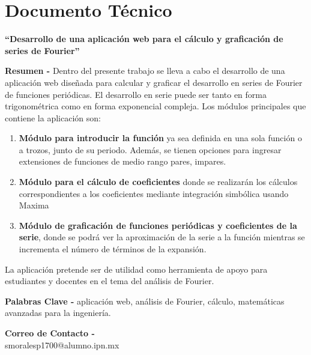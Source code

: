 \chapter{Documento Técnico}
\begin{center}
	\textbf{\Large “Desarrollo de una aplicación web para el cálculo y graficación de series de Fourier”}
	\vspace{0.5cm}
\end{center}

\textbf{Resumen -} Dentro del presente trabajo se lleva a cabo el desarrollo de una aplicación web diseñada para calcular y graficar el desarrollo en series de Fourier de funciones periódicas. El desarrollo en serie puede ser tanto en forma trigonométrica como en forma exponencial compleja. Los módulos principales que contiene la aplicación son:

\begin{enumerate}
	\item \textbf{Módulo para introducir la función} ya sea definida en una sola función o a trozos, junto de su periodo. Además, se tienen opciones para ingresar extensiones de funciones de medio rango pares, impares.
	\item \textbf{Módulo para el cálculo de coeficientes} donde se realizarán los cálculos correspondientes a los coeficientes mediante integración simbólica usando Maxima
	\item \textbf{Módulo de graficación de funciones periódicas y coeficientes de la serie}, donde se podrá ver la aproximación de la serie a la función mientras se incrementa el número de términos de la expansión.
\end{enumerate}

 La aplicación pretende ser de utilidad como herramienta de apoyo para estudiantes y docentes en el tema del análisis de Fourier.

\vspace{0.5cm}

\textbf{Palabras Clave -} aplicación web, análisis de Fourier, cálculo, matemáticas avanzadas para la ingeniería.

\vspace{0.5cm}

\textbf{Correo de Contacto -} \\
smoralesp1700@alumno.ipn.mx \\